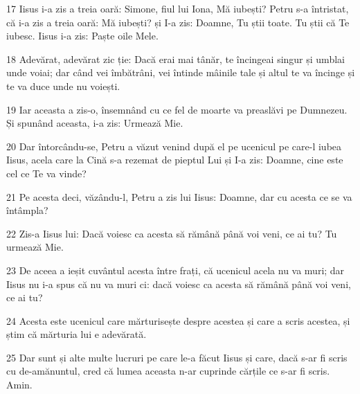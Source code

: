 \par 17 Iisus i-a zis a treia oară: Simone, fiul lui Iona, Mă iubești? Petru s-a întristat, că i-a zis a treia oară: Mă iubești? și I-a zis: Doamne, Tu știi toate. Tu știi că Te iubesc. Iisus i-a zis: Paște oile Mele.
\par 18 Adevărat, adevărat zic ție: Dacă erai mai tânăr, te încingeai singur și umblai unde voiai; dar când vei îmbătrâni, vei întinde mâinile tale și altul te va încinge și te va duce unde nu voiești.
\par 19 Iar aceasta a zis-o, însemnând cu ce fel de moarte va preaslăvi pe Dumnezeu. Și spunând aceasta, i-a zis: Urmează Mie.
\par 20 Dar întorcându-se, Petru a văzut venind după el pe ucenicul pe care-l iubea Iisus, acela care la Cină s-a rezemat de pieptul Lui și I-a zis: Doamne, cine este cel ce Te va vinde?
\par 21 Pe acesta deci, văzându-l, Petru a zis lui Iisus: Doamne, dar cu acesta ce se va întâmpla?
\par 22 Zis-a Iisus lui: Dacă voiesc ca acesta să rămână până voi veni, ce ai tu? Tu urmează Mie.
\par 23 De aceea a ieșit cuvântul acesta între frați, că ucenicul acela nu va muri; dar Iisus nu i-a spus că nu va muri ci: dacă voiesc ca acesta să rămână până voi veni, ce ai tu?
\par 24 Acesta este ucenicul care mărturisește despre acestea și care a scris acestea, și știm că mărturia lui e adevărată.
\par 25 Dar sunt și alte multe lucruri pe care le-a făcut Iisus și care, dacă s-ar fi scris cu de-amănuntul, cred că lumea aceasta n-ar cuprinde cărțile ce s-ar fi scris. Amin.


